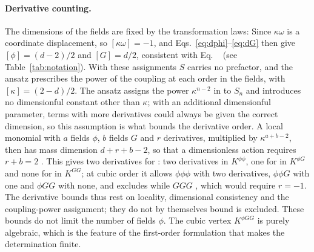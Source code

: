 \documentclass[prd,aps,preprint,superscriptaddress,nofootinbib,amsmath,amssymb,eqsecnum]{revtex4-2}
\providecommand{\DIFaddtex}[1]{{\protect\color{blue} \sf #1}} %
\providecommand{\DIFdeltex}[1]{{\protect\color{red} \scriptsize #1}} %
\providecommand{\DIFaddbegin}{} %
\providecommand{\DIFaddend}{} %
\providecommand{\DIFdelbegin}{} %
\providecommand{\DIFdelend}{} %
\providecommand{\DIFadd}[1]{\texorpdfstring{\DIFaddtex{#1}}{#1}} %
\providecommand{\DIFdel}[1]{\texorpdfstring{\DIFdeltex{#1}}{}} %
\begin{document}
\paragraph{Derivative counting.} \DIFdelbegin \DIFdel{The dimensions of the fields are fixed by the
transformation laws: }\DIFdelend \DIFaddbegin \DIFadd{Since }\DIFaddend $\kappa\omega$ is a coordinate displacement,
\DIFdelbegin \DIFdel{so }\DIFdelend $[\kappa\omega]=-1$, and Eqs.~\eqref{eq:dphi}--\eqref{eq:dG} \DIFdelbegin \DIFdel{then }\DIFdelend give $[\phi]=(d-2)/2$ and
$[G]=d/2$, \DIFdelbegin \DIFdel{consistent
with Eq. ~}%
\DIFdel{(see Table~\ref{tab:notation}). With these assignments $S$ carries no
prefactor, and the ansatz prescribes the power of the coupling at each order in the fields,
}\DIFdelend \DIFaddbegin \DIFadd{with $[\kappa]=(2-d)/2$. The ansatz assigns the power }\DIFaddend $\kappa^{n-2}$ \DIFdelbegin \DIFdel{in }\DIFdelend \DIFaddbegin \DIFadd{to }\DIFaddend $S_n$ \DIFaddbegin \DIFadd{and
introduces no dimensionful constant other than $\kappa$; with an additional dimensionful
parameter, terms with more derivatives could always be given the correct dimension, so this
assumption is what bounds the derivative order}\DIFaddend . A local monomial with $a$ fields $\phi$, $b$
fields $G$ and $r$ derivatives, multiplied by $\kappa^{a+b-2}$, \DIFdelbegin \DIFdel{then }\DIFdelend has mass dimension $d+r+b-2$,
so that a dimensionless action requires $r+b=2$\DIFdelbegin \DIFdel{. This gives two derivatives for }\DIFdelend \DIFaddbegin \DIFadd{: two derivatives in }\DIFaddend $K^{\phi\phi}$, one \DIFdelbegin \DIFdel{for }\DIFdelend \DIFaddbegin \DIFadd{in
}\DIFaddend $K^{\phi G}$ and none \DIFdelbegin \DIFdel{for }\DIFdelend \DIFaddbegin \DIFadd{in }\DIFaddend $K^{GG}$; at cubic order \DIFdelbegin \DIFdel{it allows }\DIFdelend $\phi\phi\phi$ with two\DIFdelbegin \DIFdel{derivatives}\DIFdelend , $\phi\phi G$ with
one and $\phi GG$ with none, \DIFdelbegin \DIFdel{and excludes }\DIFdelend \DIFaddbegin \DIFadd{while }\DIFaddend $GGG$ \DIFdelbegin \DIFdel{, which would require $r=-1$. The derivative bounds thus rest on locality, dimensional consistency and the coupling-power assignment; they do not by themselves bound }\DIFdelend \DIFaddbegin \DIFadd{is excluded. These bounds do not limit }\DIFaddend the number of
fields $\phi$. The cubic vertex $K^{\phi GG}$ is purely algebraic, which is the feature of the
first-order formulation that makes the determination finite.
\end{document}

